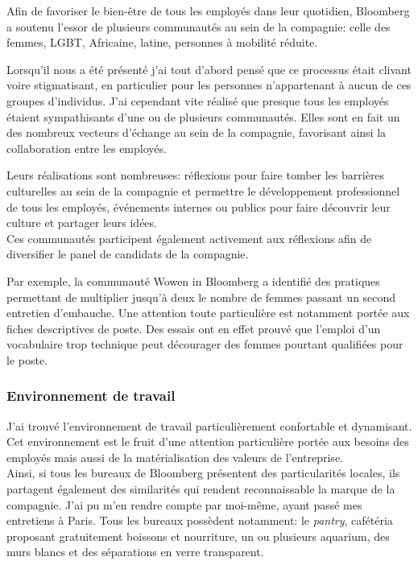 \documentclass[11pt, oneside, titlepage, a4paper]{article}
\begin{document}
Afin de favoriser le bien-être de tous les employés dans leur quotidien, Bloomberg a soutenu l'essor de plusieurs communautés au sein de la compagnie: celle des femmes, LGBT, Africaine, latine, personnes à mobilité réduite.

Lorsqu'il nous a été présenté j'ai tout d'abord pensé que ce processus était clivant voire stigmatisant, en particulier pour les personnes n'appartenant à aucun de ces \og groupes\fg{} d'individus. J'ai cependant vite réalisé que presque tous les employés étaient sympathisants d'une ou de plusieurs communautés. Elles sont en fait un des nombreux vecteurs d'échange au sein de la compagnie, favorisant ainsi la collaboration entre les employés.

Leurs réalisations sont nombreuses: réflexions pour faire tomber les barrières culturelles au sein de la compagnie et permettre le développement professionnel de tous les employés, événements internes ou publics pour faire découvrir leur culture et partager leurs idées.
\\

Ces communautés participent également activement aux réflexions afin de diversifier le panel de candidats de la compagnie.

Par exemple, la communauté Wowen in Bloomberg a identifié des pratiques permettant de multiplier jusqu'à deux le nombre de femmes passant un second entretien d'embauche. Une attention toute particulière est notamment portée aux fiches descriptives de poste. Des essais ont en effet prouvé que l'emploi d'un vocabulaire trop technique peut décourager des femmes pourtant qualifiées pour le poste.
		\subsubsection{Environnement de travail}
J'ai trouvé l'environnement de travail particulièrement confortable et dynamisant. Cet environnement est le fruit d'une attention particulière portée aux besoins des employés mais aussi de la matérialisation des valeurs de l'entreprise.
\\

Ainsi, si tous les bureaux de Bloomberg présentent des particularités locales, ils partagent également des similarités qui rendent reconnaissable la marque de la compagnie. J'ai pu m'en rendre compte par moi-même, ayant passé mes entretiens à Paris. Tous les bureaux possèdent notamment: le \textit{pantry}, cafétéria proposant gratuitement boissons et nourriture, un ou plusieurs aquarium, des murs blancs et des séparations en verre transparent.
\end{document}
